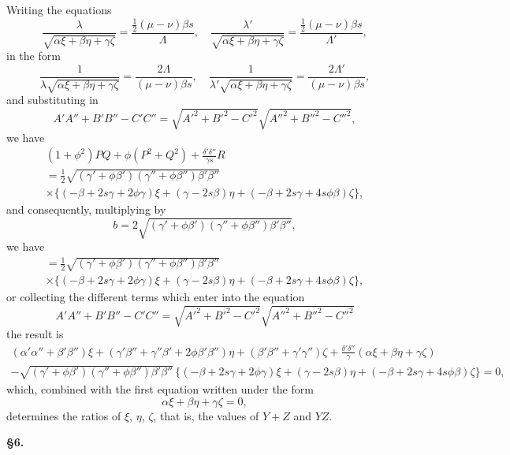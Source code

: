 \documentclass[11pt]{article}
\begin{document}
Writing the equations
\[
\frac{\lambda}{\sqrt{\alpha\xi+\beta\eta+\gamma\zeta}} = \frac{\tfrac{1}{2}(\mu-\nu)\beta s}{\Lambda}, \quad \frac{\lambda'}{\sqrt{\alpha\xi+\beta\eta+\gamma\zeta}} = \frac{\tfrac{1}{2}(\mu-\nu)\beta s}{\Lambda'},
\]
in the form
\[
\frac{1}{\lambda\sqrt{\alpha\xi+\beta\eta+\gamma\zeta}} = \frac{2\Lambda}{(\mu-\nu)\beta s}, \quad \frac{1}{\lambda'\sqrt{\alpha\xi+\beta\eta+\gamma\zeta}} = \frac{2\Lambda'}{(\mu-\nu)\beta s},
\]
and substituting in
\[
A'A''+B'B''-C'C'' = \sqrt{A'^2+B'^2-C'^2}\sqrt{A''^2+B''^2-C''^2},
\]
we have
\begin{multline*}
(1+\phi^2)PQ + \phi(P^2+Q^2) + \tfrac{\delta'\delta''}{\gamma s}R \\
= \tfrac{1}{2}\sqrt{(\gamma'+\phi\beta')(\gamma''+\phi\beta'')\beta'\beta''} \\
\times \{(-\beta+2s\gamma+2\phi\gamma)\xi + (\gamma-2s\beta)\eta + (-\beta+2s\gamma+4s\phi\beta)\zeta\},
\end{multline*}
and consequently, multiplying by
\[
b = 2\sqrt{(\gamma'+\phi\beta')(\gamma''+\phi\beta'')\beta'\beta''},
\]
we have
\begin{multline*}
= \tfrac{1}{2}\sqrt{(\gamma'+\phi\beta')(\gamma''+\phi\beta'')\beta'\beta''} \\
\times \{(-\beta+2s\gamma+2\phi\gamma)\xi + (\gamma-2s\beta)\eta + (-\beta+2s\gamma+4s\phi\beta)\zeta\},
\end{multline*}
or collecting the different terms which enter into the equation
\[
A'A''+B'B''-C'C'' = \sqrt{A'^2+B'^2-C'^2}\sqrt{A''^2+B''^2-C''^2}
\]
the result is
\begin{multline*}
(\alpha'\alpha''+\beta'\beta'')\xi + (\gamma'\beta''+\gamma''\beta'+2\phi\beta'\beta'')\eta + (\beta'\beta''+\gamma'\gamma'')\zeta + \tfrac{\delta'\delta''}{\gamma}(\alpha\xi+\beta\eta+\gamma\zeta)\\
- \sqrt{(\gamma'+\phi\beta')(\gamma''+\phi\beta'')\beta'\beta''}\,\{(-\beta+2s\gamma+2\phi\gamma)\xi+(\gamma-2s\beta)\eta+(-\beta+2s\gamma+4s\phi\beta)\zeta\} = 0,
\end{multline*}
which, combined with the first equation written under the form
\[
\alpha\xi+\beta\eta+\gamma\zeta = 0,
\]
determines the ratios of $\xi$, $\eta$, $\zeta$, that is, the values of $Y+Z$ and $YZ$.

\newpage
\setcounter{page}{73}

\noindent\textbf{\S 6.}
\end{document}
